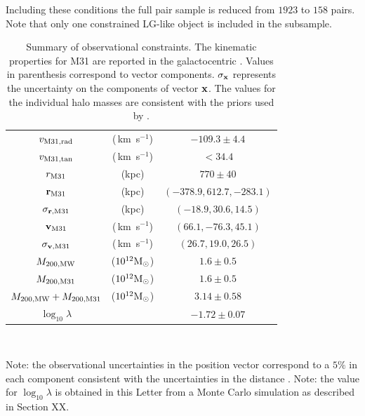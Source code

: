 \documentclass{emulateapj}
\newcommand{\kms}{\,km~s$^{-1}$}
\newcommand{\Msun}{{\ifmmode{{\rm {M_{\odot}}}}\else{${\rm{M_{\odot}}}$}\fi}}
\begin{document}
Including these conditions the full pair sample is reduced from $1923$
to $158$ pairs. Note that only one constrained LG-like object is
included in the subsample. 


\begin{table}
\caption{Summary of observational constraints. The kinematic
  properties for M31 are reported in the galactocentric
  \citep{vanderMarel12}. Values in parenthesis correspond to vector
  components. $\sigma_{\bf x}$ represents the uncertainty on the
  components of vector ${\bf x}$. The values for the individual halo
masses are consistent with the priors used by \cite{vanderMarel12}.}
\begin{center}
\begin{tabular}{ccc}\hline
$v_{\rm M31,rad}$ &(\kms) & $-109.3\pm 4.4$\\
$v_{\rm M31,tan}$ &(\kms) & $<34.4$\\
$r_{\rm M31}$ &(kpc) & $770\pm 40$\\
${\bf r}_{\rm M31}$ & (kpc) &$(-378.9, 612.7, -283.1)$\\
$\sigma_{{\bf r}, {\rm M31}}$ & (kpc) &$(-18.9, 30.6, 14.5)$\\
${\bf v}_{\rm M31}$ & (\kms) & $(66.1, -76.3, 45.1)$\\
$\sigma_{{\bf v},{\rm M31}}$ & (\kms) &$(26.7, 19.0, 26.5)$\\
$M_{\rm 200, MW}$ & ($10^{12}\Msun$) & $1.6\pm0.5$ \\
$M_{\rm 200, M31}$ & ($10^{12}\Msun$) & $1.6\pm0.5$ \\
$M_{\rm 200,MW} + M_{\rm 200, M31}$ & ($10^{12}\Msun$) & $3.14\pm 0.58$\\
$\log_{10}\lambda$& & $-1.72\pm 0.07$ \\\hline
\end{tabular}\\
\end{center}
\vspace{1mm}
Note: the observational uncertainties in the position vector
correspond to a $5\%$ in each component consistent with the
uncertainties in the distance \citep[see references
  in][]{vanderMarel08}.
Note: the value for $\log_{10}\lambda$ is obtained in this Letter
from a Monte Carlo simulation as described in Section XX.
\label{table:1}
\end{table}
\end{document}
